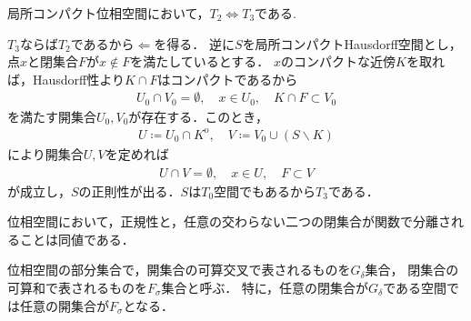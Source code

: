 	\begin{screen}
		\begin{thm}
		\label{thm:T_2_equals_to_T_3_in_locally_compact_spaces}
			局所コンパクト位相空間において，$T_2 \Longleftrightarrow T_3$である.
		\end{thm}
	\end{screen}
	
	\begin{prf}
		$T_3$ならば$T_2$であるから$\Longleftarrow$を得る．
		逆に$S$を局所コンパクトHausdorff空間とし，点$x$と閉集合$F$が$x \notin F$を満たしているとする．
		$x$のコンパクトな近傍$K$を取れば，Hausdorff性より$K \cap F$はコンパクトであるから
		\begin{align}
			U_0 \cap V_0 = \emptyset, \quad x \in U_0,  \quad K \cap F \subset V_0
		\end{align}
		を満たす開集合$U_0,V_0$が存在する．このとき，
		\begin{align}
			U \coloneqq U_0 \cap K^{\mathrm{o}},
			\quad V \coloneqq V_0 \cup (S \backslash K)
		\end{align}
		により開集合$U,V$を定めれば
		\begin{align}
			U \cap V = \emptyset,
			\quad x \in U,
			\quad F \subset V
		\end{align}
		が成立し，$S$の正則性が出る．$S$は$T_0$空間でもあるから$T_3$である．
		\QED
	\end{prf}
	
	\begin{screen}
		\begin{thm}
		\label{thm:Urysohn_lemma}
			位相空間において，正規性と，任意の交わらない二つの閉集合が関数で分離されることは同値である．
		\end{thm}
	\end{screen}
	
	\begin{screen}
		\begin{dfn}
			位相空間の部分集合で，開集合の可算交叉で表されるものを$G_\delta$集合，
			閉集合の可算和で表されるものを$F_\sigma$集合と呼ぶ．
			特に，任意の閉集合が$G_\delta$である空間では任意の開集合が$F_\sigma$となる．
		\end{dfn}
	\end{screen}
	
